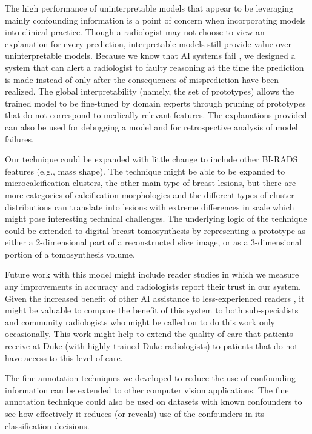 \documentclass[11pt]{article}
\begin{document}
The high performance of uninterpretable models that appear to be leveraging mainly confounding information is a point of concern when incorporating models into clinical practice. 
Though a radiologist may not choose to view an explanation for every prediction, interpretable models still provide value over uninterpretable models. 
Because we know that AI systems fail \citep{zech2018variable}, we designed a system that can alert a radiologist to faulty reasoning at the time the prediction is made instead of only after the consequences of misprediction have been realized. The global interpretability (namely, the set of prototypes) allows the trained model to be fine-tuned by domain experts through pruning of prototypes that do not correspond to medically relevant features. The explanations provided can also be used for debugging a model and for retrospective analysis of model failures.

Our technique could be expanded with little change to include other BI-RADS features (e.g., mass shape). 
The technique might be able to be expanded to microcalcification clusters, the other main type of breast lesions, but there are more categories of calcification morphologies and the different types of cluster distributions can translate into lesions with extreme differences in scale which might pose interesting technical challenges. The underlying logic of the technique could be extended to digital breast tomosynthesis by representing a prototype as either a 2-dimensional part of a reconstructed slice image, or as a 3-dimensional portion of a tomosynthesis volume.

Future work with this model might include reader studies in which we measure any improvements in accuracy and radiologists report their trust in our system. Given the increased benefit of other AI assistance to less-experienced readers \citep{park2019computer,shimauchi2011evaluation}, it might be valuable to compare the benefit of this system to both sub-specialists and community radiologists who might be called on to do this work only occasionally. This work might help to extend the quality of care that patients receive at Duke (with highly-trained Duke radiologists) to patients that do not have access to this level of care.

The fine annotation techniques we developed to reduce the use of confounding information can be extended to other computer vision applications. The fine annotation technique could also be used on datasets with known confounders to see how effectively it reduces (or reveals) use of the confounders in its classification decisions.
\end{document}
